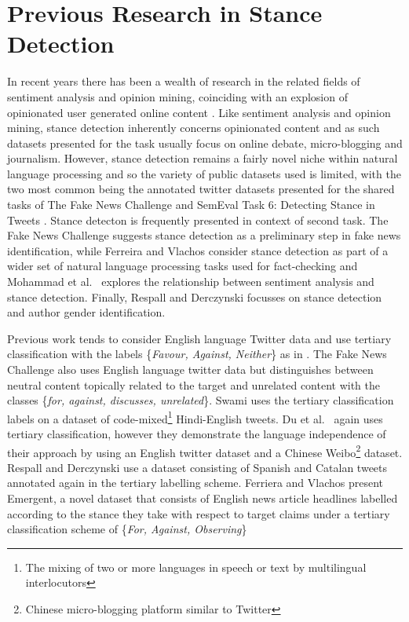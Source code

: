 \documentclass[Dissertation.tex]{subfiles}
\begin{document}
\section{Previous Research in Stance Detection}
In recent years there has been a wealth of research in the related fields of sentiment analysis and opinion mining, coinciding with an explosion of opinionated user generated online content \cite{liuSentimentAnalysisOpinion}. Like sentiment analysis and opinion mining, stance detection inherently concerns opinionated content and as such datasets presented for the task usually focus on online debate, micro-blogging and journalism. However, stance detection remains a fairly novel niche within natural language processing and so the variety of public datasets used is limited, with the two most common being the annotated twitter datasets presented for the shared tasks of The Fake News Challenge \cite{FakeNewsChallenge} and SemEval Task 6: Detecting Stance in Tweets \cite{TaskDetectingStance}. Stance detecton is frequently presented in context of second task. The Fake News Challenge suggests stance detection as a preliminary step in fake news identification, while Ferreira and Vlachos consider stance detection as part of a wider set of natural language processing tasks used for fact-checking \cite{ferreiraEmergentNovelDataset2016} and Mohammad et al.\ \cite{mohammadStanceSentimentTweets2016} explores the relationship between sentiment analysis and stance detection. Finally, Respall and Derczynski \cite{respallStanceDetectionCatalan} focusses on stance detection and author gender identification.

Previous work tends to consider English language Twitter data and use tertiary classification with the labels \{\textit{Favour, Against, Neither}\} as in \cite{TaskDetectingStance,mohammadStanceSentimentTweets2016,mohammadSemEval2016TaskDetecting2016,augensteinStanceDetectionBidirectional2016,deyTwitterStanceDetection2017,deyTopicalStanceDetection2018,StanceGenderDetection,sobhaniStanceDetectionAnalysis}. The Fake News Challenge \cite{FakeNewsChallenge} also uses English language twitter data but distinguishes between neutral content topically related to the target and unrelated content with the classes \{\textit{for, against, discusses, unrelated}\}. Swami \cite{swamiEnglishHindiCodeMixedCorpus2018} uses the tertiary classification labels on a dataset of code-mixed\footnote{The mixing of two or more languages in speech or text by multilingual interlocutors} Hindi-English tweets. Du et al.\  \cite{duStanceClassificationTargetspecific} again uses tertiary classification, however they demonstrate the language independence of their approach by using an English twitter dataset and a Chinese Weibo\footnote{Chinese micro-blogging platform similar to Twitter} dataset.  Respall and Derczynski \cite{respallStanceDetectionCatalan} use a dataset consisting of Spanish and Catalan tweets annotated again in the tertiary labelling scheme. Ferriera and Vlachos \cite{ferreiraEmergentNovelDataset2016} present Emergent, a novel dataset that consists of English news article headlines labelled according to the stance they take with respect to target claims under a tertiary classification scheme of \{\textit{For, Against, Observing}\} 
\end{document}
